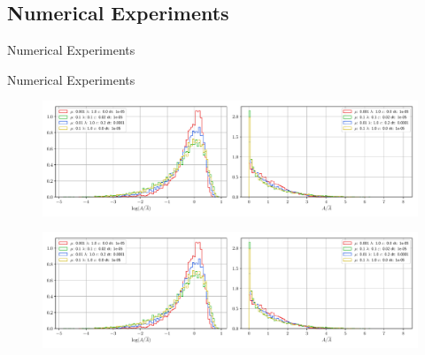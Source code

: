 \documentclass[usenames,dvipsnames]{beamer}
\begin{document}




\subsection{Numerical Experiments}

\begin{frame}{Numerical Experiments}
    \begin{minipage}{0.5\textwidth}

    \end{minipage}
\end{frame}


\begin{frame}{Numerical Experiments}
\begin{figure}
    \includegraphics[trim={0 0 44em 0},clip=true,scale=0.4]{figures/coupled_model/new_data/areas.pdf}
\end{figure}
\vspace{-1.5em}
\begin{figure}
    \includegraphics[trim={43em 0 0 0},clip=true,scale=0.4]{figures/coupled_model/new_data/areas.pdf}
\end{figure}
\end{frame}
\end{document}
